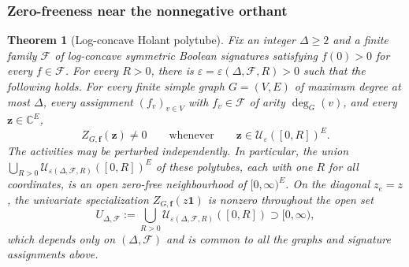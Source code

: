 \documentclass[11pt,reqno]{article}
\theoremstyle{plain}
\newtheorem{theorem}{Theorem}[section]
\theoremstyle{definition}
\theoremstyle{remark}
\theoremstyle{definition}
\theoremstyle{remark}
\newcommand{\C}{\mathbb{C}}
\newcommand{\eps}{\varepsilon}
\newcommand{\Deg}{\Delta}                        %
\begin{document}
\subsubsection{Zero-freeness near the nonnegative orthant}

\begin{theorem}[Log-concave Holant polytube]
\label{thm:holant-box}
Fix an integer \(\Deg\ge2\) and a finite family \(\mathcal F\) of log-concave
symmetric Boolean signatures satisfying \(f(0)>0\) for every
\(f\in\mathcal F\).  For every \(R>0\), there is
\(\eps=\eps(\Deg,\mathcal F,R)>0\) such that the following holds.
For every finite simple graph \(G=(V,E)\) of maximum degree at most \(\Deg\),
every assignment \((f_v)_{v\in V}\) with \(f_v\in\mathcal F\) of arity
\(\deg_G(v)\), and every \(\mathbf z\in\C^E\),
\[
  Z_{G,\mathbf f}(\mathbf z)\ne0
  \qquad\text{whenever}\qquad
  \mathbf z\in\mathcal U_\eps([0,R])^E.
\]
The activities may be perturbed independently.  In particular, the union
\(\bigcup_{R>0}\mathcal U_{\eps(\Deg,\mathcal F,R)}([0,R])^E\) of these
polytubes, each with one \(R\) for all coordinates, is an open zero-free
neighbourhood of \([0,\infty)^E\).
On the diagonal \(z_e=z\), the univariate specialization
\(Z_{G,\mathbf f}(z\mathbf1)\) is nonzero throughout the open set
\[
  U_{\Deg,\mathcal F}
  :=\bigcup_{R>0}\mathcal U_{\eps(\Deg,\mathcal F,R)}([0,R])
  \supset[0,\infty),
\]
which depends only on \((\Deg,\mathcal F)\) and is common to all the
graphs and signature assignments above.
\end{theorem}
\end{document}
